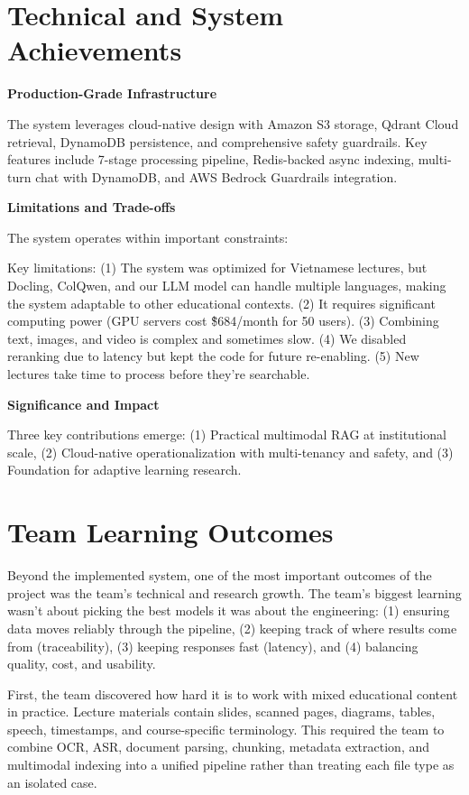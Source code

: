 \section{Technical and System Achievements}

\textbf{Production-Grade Infrastructure}

The system leverages cloud-native design with Amazon S3 storage, Qdrant Cloud retrieval, DynamoDB persistence, and comprehensive safety guardrails. Key features include 7-stage processing pipeline, Redis-backed async indexing, multi-turn chat with DynamoDB, and AWS Bedrock Guardrails integration.

\textbf{Limitations and Trade-offs}

The system operates within important constraints:

Key limitations: (1) The system was optimized for Vietnamese lectures, but Docling, ColQwen, and our LLM model can handle multiple languages, making the system adaptable to other educational contexts. (2) It requires significant computing power (GPU servers cost \~\$684/month for 50 users). (3) Combining text, images, and video is complex and sometimes slow. (4) We disabled reranking due to latency but kept the code for future re-enabling. (5) New lectures take time to process before they're searchable.

\textbf{Significance and Impact}

Three key contributions emerge: (1) Practical multimodal RAG at institutional scale, (2) Cloud-native operationalization with multi-tenancy and safety, and (3) Foundation for adaptive learning research.

\section{Team Learning Outcomes}

Beyond the implemented system, one of the most important outcomes of the project was the team's technical and research growth. The team's biggest learning wasn't about picking the best models it was about the engineering: (1) ensuring data moves reliably through the pipeline, (2) keeping track of where results come from (traceability), (3) keeping responses fast (latency), and (4) balancing quality, cost, and usability.

First, the team discovered how hard it is to work with mixed educational content in practice. Lecture materials contain slides, scanned pages, diagrams, tables, speech, timestamps, and course-specific terminology. This required the team to combine OCR, ASR, document parsing, chunking, metadata extraction, and multimodal indexing into a unified pipeline rather than treating each file type as an isolated case.

